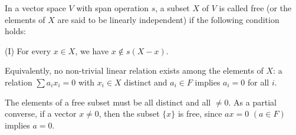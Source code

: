 In a vector space $V$ with span operation $s$, a subset $X$ of $V$ is called free (or the elements of $X$ are said to be linearly independent) if the following condition holds:

(I) For every $x \in X$, we have $x \notin s(X - x)$.

Equivalently, no non-trivial linear relation exists among the elements of $X$: a relation $\sum a_i x_i = 0$ with $x_i \in X$ distinct and $a_i \in F$ implies $a_i = 0$ for all $i$.

The elements of a free subset must be all distinct and all $\neq 0$. As a partial converse, if a vector $x \neq 0$, then the subset $\{x\}$ is free, since $ax = 0$ $(a \in F)$ implies $a = 0$.
